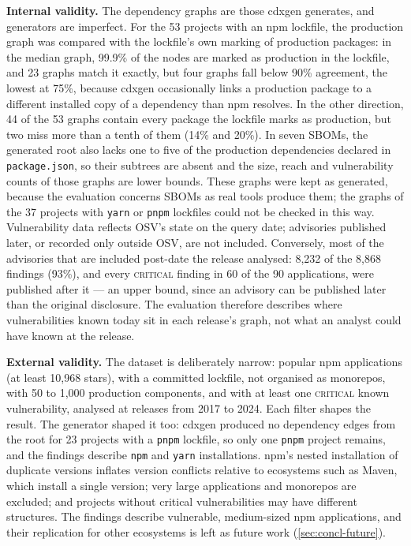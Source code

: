 \textbf{Internal validity.} The dependency graphs are those cdxgen generates, and generators are imperfect. For the 53 projects with an npm lockfile, the production graph was compared with the lockfile's own marking of production packages: in the median graph, 99.9\% of the nodes are marked as production in the lockfile, and 23 graphs match it exactly, but four graphs fall below 90\% agreement, the lowest at 75\%, because cdxgen occasionally links a production package to a different installed copy of a dependency than npm resolves. In the other direction, 44 of the 53 graphs contain every package the lockfile marks as production, but two miss more than a tenth of them (14\% and 20\%). In seven SBOMs, the generated root also lacks one to five of the production dependencies declared in \texttt{package.json}, so their subtrees are absent and the size, reach and vulnerability counts of those graphs are lower bounds. These graphs were kept as generated, because the evaluation concerns SBOMs as real tools produce them; the graphs of the 37 projects with \texttt{yarn} or \texttt{pnpm} lockfiles could not be checked in this way. Vulnerability data reflects OSV's state on the query date; advisories published later, or recorded only outside OSV, are not included. Conversely, most of the advisories that are included post-date the release analysed: 8{,}232 of the 8{,}868 findings (93\%), and every \textsc{critical} finding in 60 of the 90 applications, were published after it --- an upper bound, since an advisory can be published later than the original disclosure. The evaluation therefore describes where vulnerabilities known today sit in each release's graph, not what an analyst could have known at the release.

\textbf{External validity.} The dataset is deliberately narrow: popular npm applications (at least 10{,}968 stars), with a committed lockfile, not organised as monorepos, with 50 to 1{,}000 production components, and with at least one \textsc{critical} known vulnerability, analysed at releases from 2017 to 2024. Each filter shapes the result. The generator shaped it too: cdxgen produced no dependency edges from the root for 23 projects with a \texttt{pnpm} lockfile, so only one \texttt{pnpm} project remains, and the findings describe \texttt{npm} and \texttt{yarn} installations. npm's nested installation of duplicate versions inflates version conflicts relative to ecosystems such as Maven, which install a single version; very large applications and monorepos are excluded; and projects without critical vulnerabilities may have different structures. The findings describe vulnerable, medium-sized npm applications, and their replication for other ecosystems is left as future work (\autoref{sec:concl-future}).

